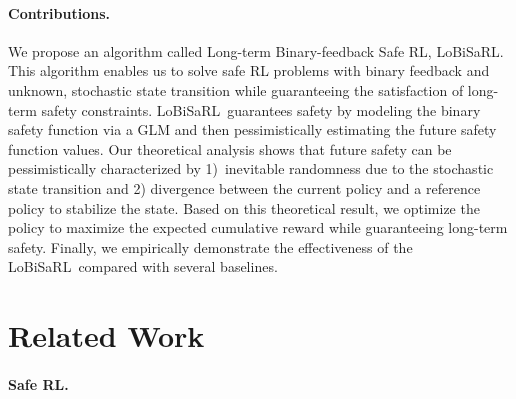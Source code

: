 \documentclass[letterpaper]{article} %
\newcommand{\algo}{\textsf{LoBiSaRL}}
\begin{document}
\paragraph{Contributions.}
%
We propose an algorithm called Long-term Binary-feedback Safe RL, \algo.
This algorithm enables us to solve safe RL problems with binary feedback and unknown, stochastic state transition while guaranteeing the satisfaction of long-term safety constraints.
\algo~guarantees safety by modeling the binary safety function via a GLM and then pessimistically estimating the future safety function values.
Our theoretical analysis shows that future safety can be pessimistically characterized by 1)~inevitable randomness due to the stochastic state transition and 2) divergence between the current policy and a reference policy to stabilize the state.
Based on this theoretical result, we optimize the policy to maximize the expected cumulative reward while guaranteeing long-term safety.
Finally, we empirically demonstrate the effectiveness of the \algo~compared with several baselines.

\section{Related Work}
\label{sec:related}

\paragraph{Safe RL.}
\end{document}
